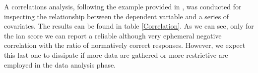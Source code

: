 \documentclass{article}
\begin{document}
A correlations analysis, following the example provided in \cite{lee2014bayesian}, was conducted for inspecting the relationship between the dependent variable and a series of covariates. The results can be found in table \ref{Correlation}. As we can see, only for the ian score we can report a reliable although very ephemeral negative correlation with the ratio of normatively correct responses. However, we expect this last one to dissipate if more data are gathered or more restrictive are employed in the data analysis phase.





\printbibliography
\end{document}
